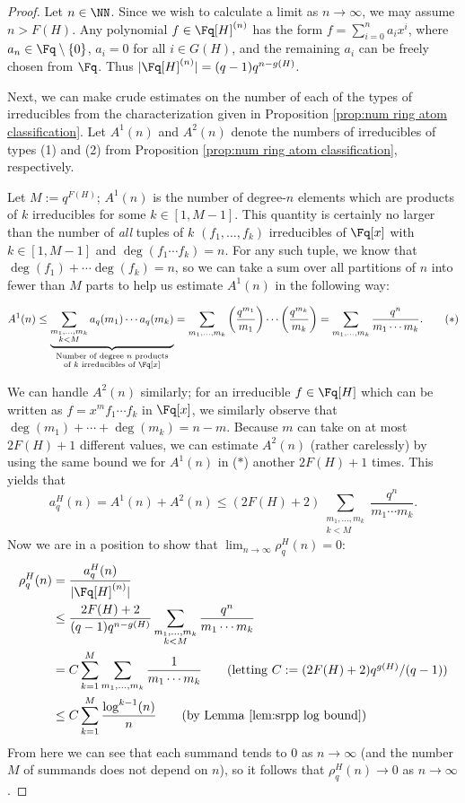 \begin{proof}
Let $n\in \NN$.
Since we wish to calculate a limit as $n\to\infty$, we may assume $n> F(H)$.
Any polynomial $f\in \Fq[H]^{(n)}$ has the form $f = \sum_{i=0}^n a_i x^i$, where $a_n \in \Fq\setminus\{0\}$, $a_i = 0$ for all $i\in G(H)$, and the remaining $a_i$ can be freely chosen from $\Fq$.
Thus $|\Fq[H]^{(n)}| = (q-1)q^{n-g(H)}$.

Next, we can make crude estimates on the number of each of the types of irreducibles from the characterization given in Proposition \ref{prop:num ring atom classification}.
Let $A^1(n)$ and $A^2(n)$ denote the numbers of irreducibles of types (1) and (2) from Proposition \ref{prop:num ring atom classification}, respectively.

Let $M := q^{F(H)}$; $A^1(n)$ is the number of degree-$n$ elements which are products of $k$ irreducibles for some $k\in [1,M-1]$.
This quantity is certainly no larger than the number of \textit{all} tuples of $k$ $(f_1,\dots,f_k)$ irreducibles of $\Fq[x]$ with $k\in [1,M-1]$ and $\deg(f_1\cdots f_k) = n$.
For any such tuple, we know that $\deg(f_1) + \cdots \deg(f_k) = n$, so we can take a sum over all partitions of $n$ into fewer than $M$ parts to help us estimate $A^1(n)$ in the following way:

\[ A^1(n) \le 
 \underbrace{\sum_{\substack{m_1,\dots, m_k \\ k < M}} a_q(m_1)\cdots a_q(m_k)}_{\substack{\textrm{Number of degree $n$ products} \\ \textrm{of $k$ irreducibles of $\Fq[x]$}}}
= \sum_{m_1,\dots,m_k} \left(\frac{q^{m_1}}{m_1}\right)\cdots \left(\frac{q^{m_k}}{m_k}\right) 
=  \sum_{m_1,\dots,m_k} \frac{q^n}{m_1\cdots m_k}. \tag{$*$}
\]

We can handle $A^2(n)$ similarly; for an irreducible $f\in \Fq[H]$ which can be written as $f= x^m f_1\cdots f_k$ in $\Fq[x]$, we similarly observe that $\deg(m_1)+\cdots+\deg(m_k) = n-m$. 
Because $m$ can take on at most $2F(H)+1$ different values, we can estimate $A^2(n)$ (rather carelessly) by using the same bound we for $A^1(n)$ in ($*$) another $2F(H)+1$ times.
This yields that
\[a_q^H(n) = A^1(n) + A^2(n) \le (2F(H)+2) \sum_{\substack{m_1,\dots,m_k \\ k < M}} \frac{q^n}{m_1\cdots m_k}. \]
Now we are in a position to show that $\lim_{n\to\infty}\rho_q^H(n) = 0$:
\begin{align*}
\rho_q^H(n) 
&= \frac{a_q^H(n)}{|\Fq[H]^{(n)}|} \\
&\le \frac{2F(H)+2}{(q-1)q^{n-g(H)}} \sum_{\substack{m_1,\dots,m_k \\ k<M}} \frac{q^n}{m_1\cdots m_k} \\
&=C \sum_{k=1}^M \sum_{m_1,\dots,m_k} \frac{1}{m_1\cdots m_k} \tag{letting $C := (2F(H)+2)q^{g(H)}/(q-1)$}\\
&\le C \sum_{k=1}^M \frac{\log^{k-1}(n)}{n} \tag{by Lemma \ref{lem:srpp log bound}} \\
\end{align*}
From here we can see that each summand tends to $0$ as $n\to\infty$ (and the number $M$ of summands does not depend on $n$), so it follows that $\rho_q^H(n) \to 0$ as $n\to \infty$.
\end{proof}